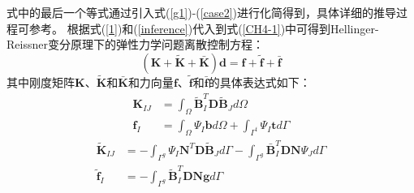 式中的最后一个等式通过引入式(\ref{g1})-(\ref{case2})进行化简得到，具体详细的推导过程可参考。
根据式(\ref{1})和(\ref{inference})代入到式(\ref{CH4-1})中可得到Hellinger-Reissner变分原理下的弹性力学问题离散控制方程：
\begin{equation}\label{equationE}
    (\pmb{K}+\pmb{\tilde{K}}+\pmb{\bar{K}})\pmb{d}=\pmb{f}+\tilde{\pmb{f}}+\bar{\pmb{f}}
\end{equation}
其中刚度矩阵$\pmb K$、$\tilde{\pmb K}$和$\bar{\pmb K}$和力向量$\pmb f$、$\tilde{\pmb f}$和$\bar{\pmb f}$的具体表达式如下：
\begin{subequations}\label{Ehr1}
\begin{align}    
    \pmb{K}_{IJ}&=\int_{\Omega}\tilde{\pmb{B}}_I^T\pmb{D}\tilde{\pmb{B}}_Jd\Omega\\
    \pmb f_I&=\int_{\Omega}\Psi_I\pmb{b}d\Omega+\int_{\Gamma^t}\Psi_I\pmb{t}d\Gamma
\end{align}
\end{subequations}
\begin{subequations}\label{Ehr2}  
\begin{align}   
    \tilde{\pmb{K}}_{IJ}&=-\int_{\Gamma^g}\Psi_I\pmb{N}^T\pmb{D}\tilde{\pmb B}_Jd\Gamma-\int_{\Gamma^g}\bar{\pmb B}_I^T\pmb{D}\pmb{N}\Psi_Jd\Gamma\\
    \tilde{\pmb f}_I&=-\int_{\Gamma^g}\tilde{\pmb B}_I^T\pmb D\pmb N\pmb{g}d\Gamma
\end{align}
\end{subequations}
